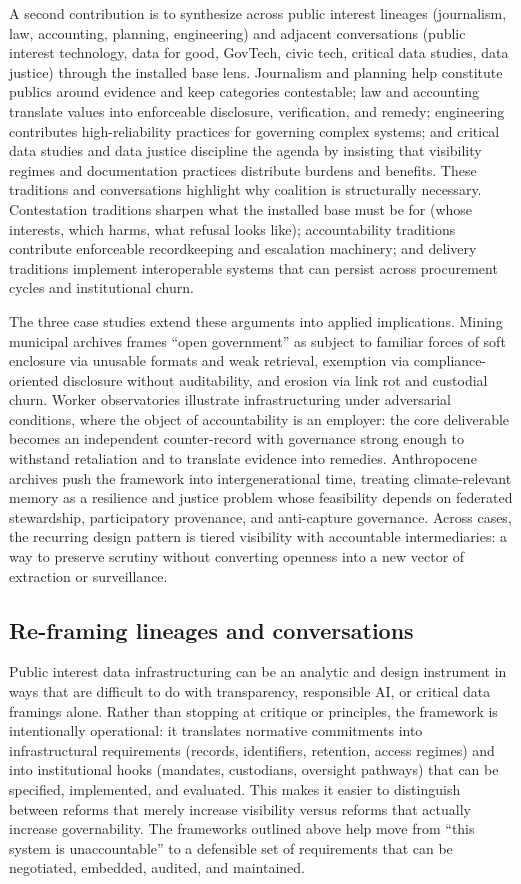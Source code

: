\documentclass[acmsmall,screen]{acmart}
\begin{document}
A second contribution is to synthesize across public interest lineages (journalism, law, accounting, planning, engineering) and adjacent conversations (public interest technology, data for good, GovTech, civic tech, critical data studies, data justice) through the installed base lens. Journalism and planning help constitute publics around evidence and keep categories contestable; law and accounting translate values into enforceable disclosure, verification, and remedy; engineering contributes high-reliability practices for governing complex systems; and critical data studies and data justice discipline the agenda by insisting that visibility regimes and documentation practices distribute burdens and benefits. These traditions and conversations highlight why coalition is structurally necessary. Contestation traditions sharpen what the installed base must be for (whose interests, which harms, what refusal looks like); accountability traditions contribute enforceable recordkeeping and escalation machinery; and delivery traditions implement interoperable systems that can persist across procurement cycles and institutional churn.

The three case studies extend these arguments into applied implications. Mining municipal archives frames ``open government'' as subject to familiar forces of soft enclosure via unusable formats and weak retrieval, exemption via compliance-oriented disclosure without auditability, and erosion via link rot and custodial churn. Worker observatories illustrate infrastructuring under adversarial conditions, where the object of accountability is an employer: the core deliverable becomes an independent counter-record with governance strong enough to withstand retaliation and to translate evidence into remedies. Anthropocene archives push the framework into intergenerational time, treating climate-relevant memory as a resilience and justice problem whose feasibility depends on federated stewardship, participatory provenance, and anti-capture governance. Across cases, the recurring design pattern is tiered visibility with accountable intermediaries: a way to preserve scrutiny without converting openness into a new vector of extraction or surveillance.

\subsection*{Re-framing lineages and conversations}
Public interest data infrastructuring can be an analytic and design instrument in ways that are difficult to do with transparency, responsible AI, or critical data framings alone. Rather than stopping at critique or principles, the framework is intentionally operational: it translates normative commitments into infrastructural requirements (records, identifiers, retention, access regimes) and into institutional hooks (mandates, custodians, oversight pathways) that can be specified, implemented, and evaluated. This makes it easier to distinguish between reforms that merely increase visibility versus reforms that actually increase governability. The frameworks outlined above help move from ``this system is unaccountable'' to a defensible set of requirements that can be negotiated, embedded, audited, and maintained.
\end{document}

